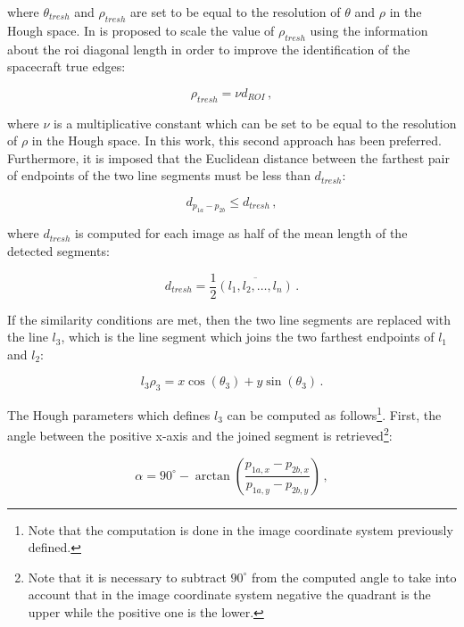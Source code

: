 where $\theta_{tresh}$ and $\rho_{tresh}$ are set to be equal to the resolution of $\theta$ and $\rho$ in the Hough space. In \cite{fracchio2019} is proposed to scale the value of $\rho_{tresh}$ using the information about the \acrshort{roi} diagonal length in order to improve the identification of the spacecraft true edges:

\begin{equation}
  \rho_{tresh} = \nu d_{ROI} \,,
\end{equation}

where $\nu$ is a multiplicative constant which can be set to be equal to the resolution of $\rho$ in the Hough space. In this work, this second approach has been preferred.
Furthermore, it is imposed that the Euclidean distance between the farthest pair of endpoints of the two line segments must be less than $d_{tresh}$:

\begin{equation}
  d_{p_{1a}-p_{2b}} \leqslant d_{tresh} \,,
\end{equation}

where $d_{tresh}$ is computed for each image as half of the mean length of the detected segments:

\begin{equation}
  d_{tresh} = {\frac{1}{2}} \overline{(l_1, l_2,\ldots, l_n)} \,.
\end{equation}

If the similarity conditions are met, then the two line segments are replaced with the line $l_3$, which is the line segment which joins the two farthest endpoints of $l_1$ and $l_2$:

\begin{equation}
  l_3 \rho_3 = x \cos (\theta_3) +  y \sin (\theta_3) \,.
\end{equation}

The Hough parameters which defines $l_3$ can be computed as follows\footnote{Note that the computation is done in the image coordinate system previously defined.}. First, the angle between the positive x-axis and the joined segment is retrieved\footnote{Note that it is necessary to subtract $90^{\circ}$ from the computed angle to take into account that in the image coordinate system negative the quadrant is the upper while the positive one is the lower.}:

\begin{equation}
  \alpha = 90^{\circ} - \arctan{\left(\frac{p_{1a,x}-p_{2b,x}}{p_{1a,y}-p_{2b,y}}\right)} \,,
\end{equation}

